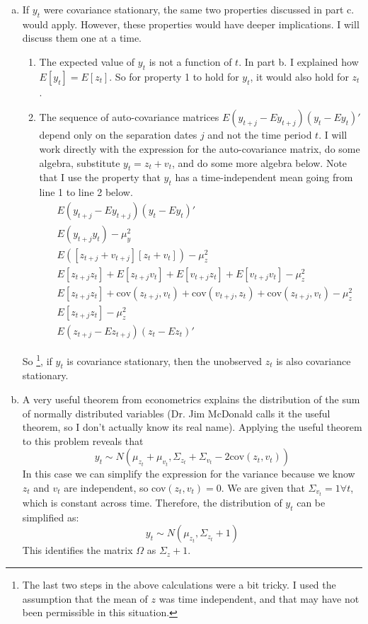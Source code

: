 \documentclass{homework}
\begin{document}
\begin{homeworkProblem}[Problem 2.24]
{\begin{enumerate}[a.]
      \item If $y_t$ were covariance stationary, the same two properties discussed in part c. would apply. However, these properties would have deeper implications. I will discuss them one at a time.
        \begin{enumerate}[1.]
          \item The expected value of $y_t$ is not a function of $t$. In part b. I explained how $E[y_t] = E[z_t]$. So for property 1 to hold for $y_t$, it would also hold for $z_t$.
          \item The sequence of auto-covariance matrices $E \left( y_{t+j} - E y_{t+j} \right) \left( y_t - E y_t \right) '$ depend only on the separation dates $j$ and not the time period $t$. I will work directly with the expression for the auto-covariance matrix, do some algebra, substitute $y_t = z_t + v_t$, and do some more algebra below. Note that I use the property that $y_t$ has a time-independent mean going from line 1 to line 2 below.
            \begin{align*}
              &E \left( y_{t+j} - E y_{t+j} \right) \left( y_t - E y_t \right) ' \\
              &E(y_{t+j}y_t) - \mu_y^2 \\
              &E([z_{t+j} + v_{t+j}][z_t + v_t]) - \mu_z^2 \\
              &E[z_{t+j}z_t] + E[z_{t+j}v_t] + E[v_{t+j}z_t] + E[v_{t+j}v_t] - \mu_z^2 \\
              &E[z_{t+j} z_t] + \text{cov}(z_{t+j}, v_t) + \text{cov}(v_{t+j}, z_t) + \text{cov}(z_{t+j}, v_t) - \mu_z^2 \\
              &E[z_{t+j} z_t] - \mu_z^2 \\
               &E\left( z_{t+j} - E z_{t+j} \right) \left( z_t - E z_t \right) '
            \end{align*}
        \end{enumerate}
         So \footnote{The last two steps in the above calculations were a bit tricky. I used the assumption that the mean of $z$ was time independent, and that may have not been permissible in this situation.}, if $y_t$ is covariance stationary, then the unobserved $z_t$ is also covariance stationary.

      \item A very useful theorem from econometrics explains the distribution of the sum of normally distributed variables (Dr. Jim McDonald calls it the useful theorem, so I don't actually know its real name). Applying the useful theorem to this problem reveals that $$y_t \sim N \left(\mu_{z_t} + \mu_{v_t}, \Sigma_{z_t} + \Sigma_{v_t} - 2 \text{cov}(z_t, v_t) \right)$$ In this case we can simplify the expression for the variance because we know $z_t$ and $v_t$ are independent, so cov$(z_t, v_t) = 0$. We are given that $\Sigma_{v_t} = 1 \forall t$, which is constant across time. Therefore, the distribution of $y_t$ can be simplified as: $$y_t \sim N(\mu_{z_t}, \Sigma_{z_t} + 1)$$ This identifies the matrix $\Omega$ as $\Sigma_z + 1$. \medskip


\end{enumerate}}
\end{homeworkProblem}
\end{document}
